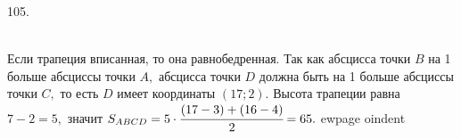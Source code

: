 105. \begin{figure}[ht!]
\end{figure}\\
Если трапеция вписанная, то она равнобедренная. Так как абсцисса точки $B$ на 1 больше абсциссы точки $A,$ абсцисса точки $D$ должна быть на 1 больше абсциссы точки $C,$ то есть $D$ имеет координаты $(17;2).$ Высота трапеции равна $7-2=5,$ значит $S_{ABCD}=5\cdot\cfrac{(17-3)+(16-4)}{2}=65.$
ewpage
oindent
